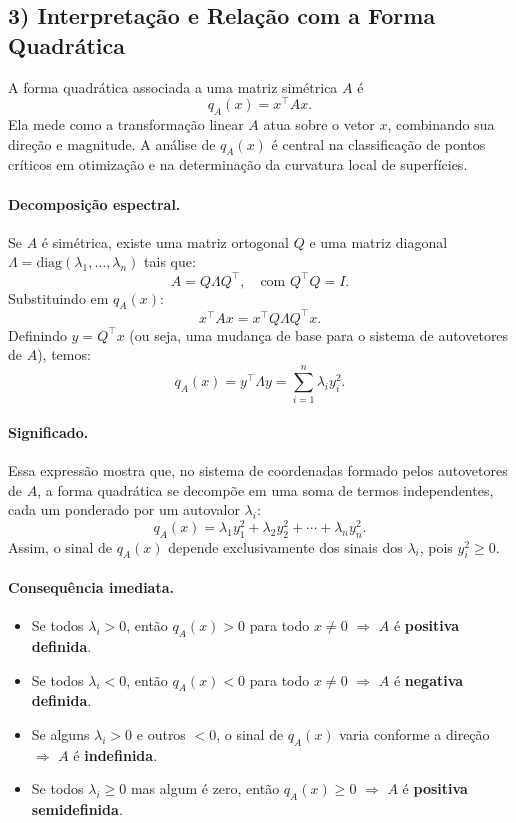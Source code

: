 \documentclass[9pt,a4paper]{extarticle}
\begin{document}
\subsection*{3) Interpreta\c c\~ao e Rela\c c\~ao com a Forma Quadr\'atica}

A forma quadr\'atica associada a uma matriz sim\'etrica $A$ \'e
\[
q_A(x) = x^\top A x.
\]
Ela mede como a transforma\c c\~ao linear $A$ atua sobre o vetor $x$, combinando sua dire\c c\~ao e magnitude.  
A an\'alise de $q_A(x)$ \'e central na classifica\c c\~ao de pontos cr\'iticos em otimiza\c c\~ao e na determina\c c\~ao da curvatura local de superf\'icies.

\paragraph{Decomposi\c c\~ao espectral.}
Se $A$ \'e sim\'etrica, existe uma matriz ortogonal $Q$ e uma matriz diagonal $\Lambda = \mathrm{diag}(\lambda_1, \dots, \lambda_n)$ tais que:
\[
A = Q \Lambda Q^\top, \quad \text{com } Q^\top Q = I.
\]
Substituindo em $q_A(x)$:
\[
x^\top A x = x^\top Q \Lambda Q^\top x.
\]
Definindo $y = Q^\top x$ (ou seja, uma mudan\c ca de base para o sistema de autovetores de $A$), temos:
\[
q_A(x) = y^\top \Lambda y = \sum_{i=1}^n \lambda_i y_i^2.
\]

\paragraph{Significado.}
Essa express\~ao mostra que, no sistema de coordenadas formado pelos autovetores de $A$, a forma quadr\'atica se decomp\~oe em uma soma de termos independentes, cada um ponderado por um autovalor $\lambda_i$:
\[
q_A(x) = \lambda_1 y_1^2 + \lambda_2 y_2^2 + \cdots + \lambda_n y_n^2.
\]
Assim, o sinal de $q_A(x)$ depende exclusivamente dos sinais dos $\lambda_i$, pois $y_i^2 \ge 0$.

\paragraph{Consequ\^encia imediata.}
\begin{itemize}
  \item Se todos $\lambda_i > 0$, ent\~ao $q_A(x) > 0$ para todo $x \ne 0$ $\Rightarrow$ $A$ \'e \textbf{positiva definida}.
  \item Se todos $\lambda_i < 0$, ent\~ao $q_A(x) < 0$ para todo $x \ne 0$ $\Rightarrow$ $A$ \'e \textbf{negativa definida}.
  \item Se alguns $\lambda_i > 0$ e outros $< 0$, o sinal de $q_A(x)$ varia conforme a dire\c c\~ao $\Rightarrow$ $A$ \'e \textbf{indefinida}.
  \item Se todos $\lambda_i \ge 0$ mas algum \'e zero, ent\~ao $q_A(x)\ge0$ $\Rightarrow$ $A$ \'e \textbf{positiva semidefinida}.
\end{itemize}
\end{document}
